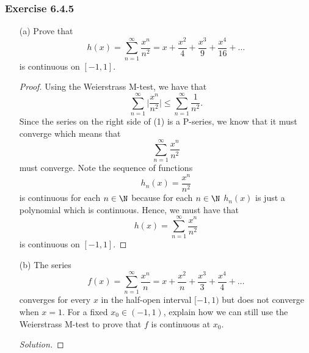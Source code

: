 \subsubsection{Exercise 6.4.5} 
\begin{enumerate}
    \item[(a)] Prove that 
        \[  h(x) = \sum_{ n=1 }^{ \infty  } \frac{ x^n  }{ n^2  } = x + \frac{ x^2  }{ 4  } + \frac{ x^3  }{ 9  } + \frac{ x^4  }{ 16 } + \dots\]
        is continuous on \( [-1,1] \).
        \begin{proof}
        Using the Weierstrass M-test, we have that
        \[  \sum_{ n=1 }^{ \infty  } \Big| \frac{ x^n  }{ n^2  }  \Big|   \leq \sum_{ n=1 }^{ \infty  } \frac{ 1 }{ n^2  } \tag{1}.\]
        Since the series on the right side of (1) is a P-series, we know that it must converge which means that 
        \[  \sum_{ n=1 }^{ \infty  } \frac{ x^n  }{ n^2  }   \] must converge. Note the sequence of functions
        \[  h_n(x) = \frac{ x^n  }{ n^2  }  \] is continuous for each \( n \in \N  \) because for each \( n \in \N  \) \( h_n(x)  \) is just a polynomial which is continuous. Hence, we must have that 
        \[  h(x) = \sum_{ n=1  }^{ \infty  } \frac{ x^n  }{ n^2  }  \]
        is continuous on \( [-1,1] \).
        \end{proof}
    \item[(b)] The series 
        \[  f(x) = \sum_{ n=1 }^{ \infty  } \frac{ x^n  }{  n  }  = x + \frac{ x^2  }{ n  }  + \frac{ x^3  }{ 3  }  + \frac{ x^4  }{  4  }  + \dots \]
        converges for every \( x  \) in the half-open interval \( [-1,1) \) but does not converge when \( x = 1  \). For a fixed \( x_0 \in (-1,1)  \), explain how we can still use the Weierstrass M-test to prove that \( f  \) is continuous at \( x_0  \).
        \begin{proof}[Solution]
        
        \end{proof}
\end{enumerate}

